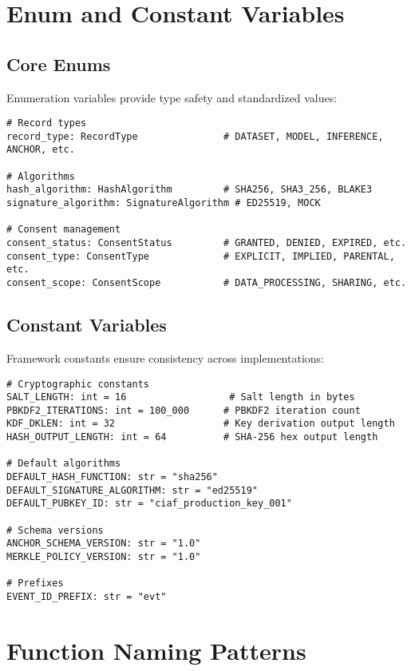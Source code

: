 \documentclass[12pt,a4paper]{article}
\begin{document}
\section{Enum and Constant Variables}

\subsection{Core Enums}

Enumeration variables provide type safety and standardized values:

\begin{lstlisting}[caption=Core Enums]
# Record types
record_type: RecordType               # DATASET, MODEL, INFERENCE, ANCHOR, etc.

# Algorithms
hash_algorithm: HashAlgorithm         # SHA256, SHA3_256, BLAKE3
signature_algorithm: SignatureAlgorithm # ED25519, MOCK

# Consent management
consent_status: ConsentStatus         # GRANTED, DENIED, EXPIRED, etc.
consent_type: ConsentType             # EXPLICIT, IMPLIED, PARENTAL, etc.
consent_scope: ConsentScope           # DATA_PROCESSING, SHARING, etc.
\end{lstlisting}

\subsection{Constant Variables}

Framework constants ensure consistency across implementations:

\begin{lstlisting}[caption=Cryptographic Constants]
# Cryptographic constants
SALT_LENGTH: int = 16                  # Salt length in bytes
PBKDF2_ITERATIONS: int = 100_000      # PBKDF2 iteration count
KDF_DKLEN: int = 32                   # Key derivation output length
HASH_OUTPUT_LENGTH: int = 64          # SHA-256 hex output length

# Default algorithms
DEFAULT_HASH_FUNCTION: str = "sha256"
DEFAULT_SIGNATURE_ALGORITHM: str = "ed25519"
DEFAULT_PUBKEY_ID: str = "ciaf_production_key_001"

# Schema versions
ANCHOR_SCHEMA_VERSION: str = "1.0"
MERKLE_POLICY_VERSION: str = "1.0"

# Prefixes
EVENT_ID_PREFIX: str = "evt"
\end{lstlisting}

\section{Function Naming Patterns}
\end{document}
